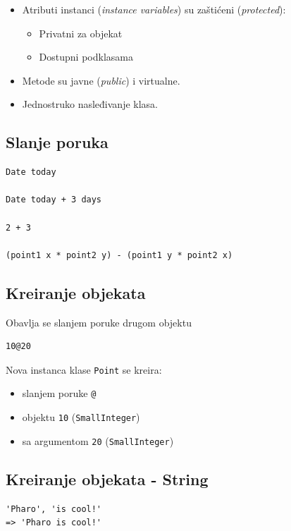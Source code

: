 \documentclass[presentation]{beamer}
\begin{document}
\begin{itemize}
\item Atributi instanci (\emph{instance variables}) su zaštićeni (\emph{protected}):
\begin{itemize}
\item Privatni za objekat
\item Dostupni podklasama
\end{itemize}
\item Metode su javne (\emph{public}) i virtualne.
\item Jednostruko nasleđivanje klasa.
\end{itemize}

\subsection{Slanje poruka}
\label{sec:orgd65163f}

\begin{verbatim}
Date today

Date today + 3 days

2 + 3

(point1 x * point2 y) - (point1 y * point2 x)
\end{verbatim}

\subsection{Kreiranje objekata}
\label{sec:org004bb57}

Obavlja se slanjem poruke drugom objektu

\begin{verbatim}
10@20
\end{verbatim}

Nova instanca klase \texttt{Point} se kreira:

\begin{itemize}
\item slanjem poruke \texttt{@}
\item objektu \texttt{10} (\texttt{SmallInteger})
\item sa argumentom \texttt{20} (\texttt{SmallInteger})
\end{itemize}

\subsection{Kreiranje objekata - String}
\label{sec:org677fcff}

\begin{verbatim}
'Pharo', 'is cool!'
=> 'Pharo is cool!'
\end{verbatim}
\end{document}
